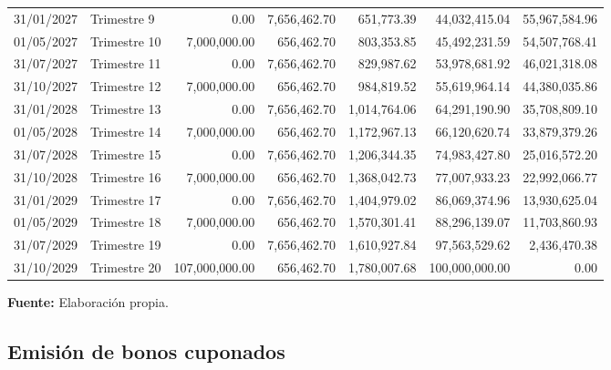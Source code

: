 \documentclass[12pt]{article}
\begin{document}
\begin{table}[H]
\begin{adjustbox}{max width=\textwidth}
\begin{threeparttable}
\begin{tabular}{llrrrrr}
              31/01/2027 & Trimestre 9 & 0.00 & 7,656,462.70 & 651,773.39 & 44,032,415.04 & 55,967,584.96 \\ 
              01/05/2027 & Trimestre 10 & 7,000,000.00 & 656,462.70 & 803,353.85 & 45,492,231.59 & 54,507,768.41 \\ 
              31/07/2027 & Trimestre 11 & 0.00 & 7,656,462.70 & 829,987.62 & 53,978,681.92 & 46,021,318.08 \\ 
              31/10/2027 & Trimestre 12 & 7,000,000.00 & 656,462.70 & 984,819.52 & 55,619,964.14 & 44,380,035.86 \\ 
              31/01/2028 & Trimestre 13 & 0.00 & 7,656,462.70 & 1,014,764.06 & 64,291,190.90 & 35,708,809.10 \\ 
              01/05/2028 & Trimestre 14 & 7,000,000.00 & 656,462.70 & 1,172,967.13 & 66,120,620.74 & 33,879,379.26 \\ 
              31/07/2028 & Trimestre 15 & 0.00 & 7,656,462.70 & 1,206,344.35 & 74,983,427.80 & 25,016,572.20 \\ 
              31/10/2028 & Trimestre 16 & 7,000,000.00 & 656,462.70 & 1,368,042.73 & 77,007,933.23 & 22,992,066.77 \\ 
              31/01/2029 & Trimestre 17 & 0.00 & 7,656,462.70 & 1,404,979.02 & 86,069,374.96 & 13,930,625.04 \\ 
              01/05/2029 & Trimestre 18 & 7,000,000.00 & 656,462.70 & 1,570,301.41 & 88,296,139.07 & 11,703,860.93 \\ 
              31/07/2029 & Trimestre 19 & 0.00 & 7,656,462.70 & 1,610,927.84 & 97,563,529.62 & 2,436,470.38 \\ 
              31/10/2029 & Trimestre 20 & 107,000,000.00 & 656,462.70 & 1,780,007.68 & 100,000,000.00 & 0.00 \\ \hline \hline     
\end{tabular}
 \begin{tablenotes}
	\item[] \small\textbf{Fuente:} Elaboración propia.
\end{tablenotes} 
\end{threeparttable}
\end{adjustbox}
\label{tabla1b}
 \end{table}


\subsection{Emisión de bonos cuponados} 
\end{document}
